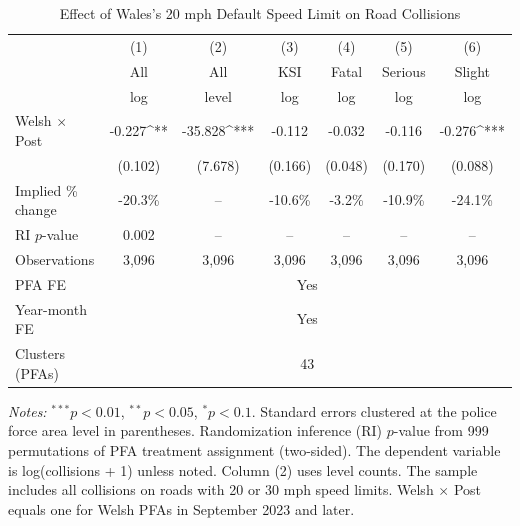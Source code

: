 \begin{table}[htbp]
\centering
\caption{Effect of Wales's 20 mph Default Speed Limit on Road Collisions}
\label{tab:main}
\begin{adjustbox}{max width=\textwidth}
\begin{tabular}{lcccccc}
\hline\hline
 & (1) & (2) & (3) & (4) & (5) & (6) \\
 & All & All & KSI & Fatal & Serious & Slight \\
 & log & level & log & log & log & log \\
\hline
Welsh $\times$ Post & -0.227^{**} & -35.828^{***} & -0.112 & -0.032 & -0.116 & -0.276^{***} \\
 & (0.102) & (7.678) & (0.166) & (0.048) & (0.170) & (0.088) \\
Implied \% change & -20.3\% & -- & -10.6\% & -3.2\% & -10.9\% & -24.1\% \\
RI $p$-value & 0.002 & -- & -- & -- & -- & -- \\
\hline
Observations & 3,096 & 3,096 & 3,096 & 3,096 & 3,096 & 3,096 \\
PFA FE & \multicolumn{6}{c}{Yes} \\
Year-month FE & \multicolumn{6}{c}{Yes} \\
Clusters (PFAs) & \multicolumn{6}{c}{43} \\
\hline\hline
\end{tabular}
\end{adjustbox}
\smallskip
\begin{minipage}{\textwidth}
\footnotesize
\textit{Notes:} $^{***}p<0.01$, $^{**}p<0.05$, $^{*}p<0.1$. Standard errors clustered at the police force area level in parentheses. Randomization inference (RI) $p$-value from 999 permutations of PFA treatment assignment (two-sided). The dependent variable is log(collisions + 1) unless noted. Column (2) uses level counts. The sample includes all collisions on roads with 20 or 30 mph speed limits. Welsh $\times$ Post equals one for Welsh PFAs in September 2023 and later.
\end{minipage}
\end{table}
